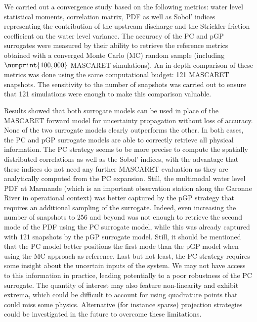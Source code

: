 We carried out a convergence study based on the following metrics: water level statistical moments, correlation matrix, PDF as well as Sobol' indices representing the contribution of the upstream discharge and the Strickler friction coefficient on the water level variance. The accuracy of the PC and pGP surrogates were measured by their ability to retrieve the reference metrics obtained with a converged Monte Carlo (MC) random sample (including $\numprint{100,000}$ MASCARET simulations). An in-depth comparison of these metrics was done using the same computational budget: 121 MASCARET snapshots. The sensitivity to the number of snapshots was carried out to ensure that 121 simulations were enough to make this comparison valuable.

Results showed that both surrogate models can be used in place of the MASCARET forward model for uncertainty propagation without loss of accuracy. None of the two surrogate models clearly outperforms the other. In both cases, the PC and pGP surrogate models are able to correctly retrieve all physical information. The PC strategy seems to be more precise to compute the spatially distributed correlations as well as the Sobol' indices, with the advantage that these indices do not need any further MASCARET evaluation as they are analytically computed from the PC expansion. Still, the multimodal water level PDF at Marmande (which is an important observation station along the Garonne River in operational context) was better captured by the pGP strategy that requires an additional sampling of the surrogate. Indeed, even increasing the number of snapshots to 256 and beyond was not enough to retrieve the second mode of the PDF using the PC surrogate model, while this was already captured with 121 snapshots by the pGP surrogate model. Still, it should be mentioned that the PC model better positions the first mode than the pGP model when using the MC approach as reference. Last but not least, the PC strategy requires some insight about the uncertain inputs of the system. We may not have access to this information in practice, leading potentially to a poor robustness of the PC surrogate. The quantity of interest may also feature non-linearity and exhibit extrema, which could be difficult to account for using quadrature points that could miss some physics. Alternative (for instance sparse) projection strategies could be investigated in the future to overcome these limitations. 

